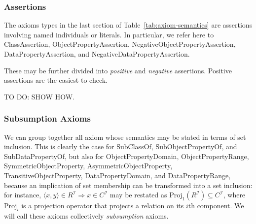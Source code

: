 \documentclass[a4paper]{article}
\newcounter{ex}
\begin{document}
\subsubsection{Assertions}

The axioms types in the last section of Table~\ref{tab:axiom-semantics} are
assertions involving named individuals or literals.
In particular, we refer here to
\textsf{ClassAssertion}, \textsf{ObjectPropertyAssertion},
\textsf{NegativeObjectPropertyAssertion}, \textsf{DataPropertyAssertion}, and
\textsf{NegativeDataPropertyAssertion}.

These may be further divided into \emph{positive} and \emph{negative} assertions.
Positive assertions are the easiest to check.

TO DO: SHOW HOW.

\subsubsection{Subsumption Axioms}

We can group together all axiom whose semantics may be stated in terms of set inclusion.
This is clearly the case for \textsf{SubClassOf}, \textsf{SubObjectPropertyOf}, and \textsf{SubDataPropertyOf},
but also for \textsf{ObjectPropertyDomain}, \textsf{ObjectPropertyRange},
\textsf{SymmetricObjectProperty}, \textsf{AsymmetricObjectProperty}, \textsf{TransitiveObjectProperty},
\textsf{DataPropertyDomain}, and \textsf{DataPropertyRange}, because an implication of set
membership can be transformed into a set inclusion: for instance,
$\langle x, y\rangle \in R^\mathcal{I} \Rightarrow x\in C^\mathcal{I}$ may be restated as
$\mathrm{Proj}_1(R^\mathcal{I}) \subseteq C^\mathcal{I}$, where $\mathrm{Proj}_i$ is a projection
operator that projects a relation on its $i$th component.
We will call these axioms collectively \emph{subsumption} axioms.
\end{document}
